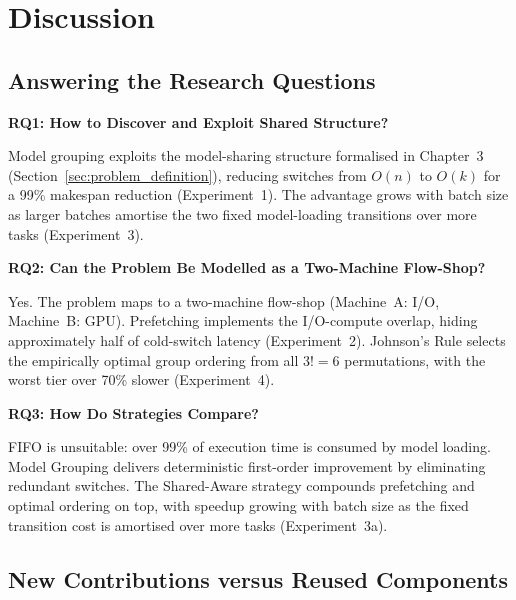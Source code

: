 \documentclass[logo,bsc,singlespacing,parskip,online]{infthesis}
\begin{document}

\chapter{Discussion}


\section{Answering the Research Questions}

\textbf{RQ1: How to Discover and Exploit Shared Structure?}

Model grouping exploits the model-sharing structure formalised in Chapter~3 (Section~\ref{sec:problem_definition}), reducing switches from $O(n)$ to $O(k)$ for a 99\% makespan reduction (Experiment~1). The advantage grows with batch size as larger batches amortise the two fixed model-loading transitions over more tasks (Experiment~3).

\textbf{RQ2: Can the Problem Be Modelled as a Two-Machine Flow-Shop?}

Yes. The problem maps to a two-machine flow-shop (Machine~A: I/O, Machine~B: GPU). Prefetching implements the I/O-compute overlap, hiding approximately half of cold-switch latency (Experiment~2). Johnson's Rule selects the empirically optimal group ordering from all $3!=6$ permutations, with the worst tier over 70\% slower (Experiment~4).

\textbf{RQ3: How Do Strategies Compare?}

FIFO is unsuitable: over 99\% of execution time is consumed by model loading. Model Grouping delivers deterministic first-order improvement by eliminating redundant switches. The Shared-Aware strategy compounds prefetching and optimal ordering on top, with speedup growing with batch size as the fixed transition cost is amortised over more tasks (Experiment~3a).

\section{New Contributions versus Reused Components}
\end{document}
